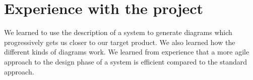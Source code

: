 \section{Experience with the project}
We learned to use the description of a system to generate diagrams which progressively gets us closer to our target product. We also learned how the different kinds of diagrams work. We learned from experience that a more agile approach to the design phase of a system is efficient compared to the standard approach.

